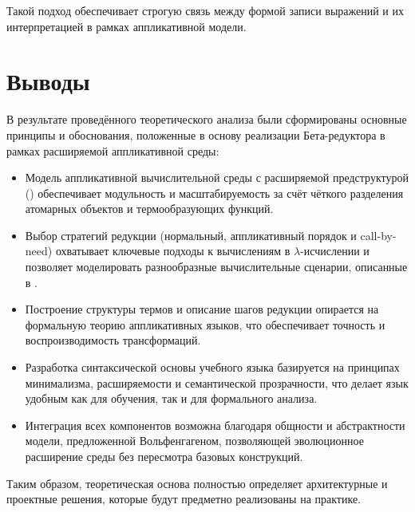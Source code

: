Такой подход обеспечивает строгую связь между формой записи выражений и их интерпретацией в рамках аппликативной модели.

\section{Выводы}

В результате проведённого теоретического анализа были сформированы основные принципы и обоснования, положенные в основу реализации Бета-редуктора в рамках расширяемой аппликативной среды:

\begin{itemize}
  \item Модель аппликативной вычислительной среды с расширяемой предструктурой (\cite{Roslovtsev2011}) обеспечивает модульность и масштабируемость за счёт чёткого разделения атомарных объектов и термообразующих функций.
  \item Выбор стратегий редукции (нормальный, аппликативный порядок и call-by-need) охватывает ключевые подходы к вычислениям в $\lambda$-исчислении и позволяет моделировать разнообразные вычислительные сценарии, описанные в \cite{Wolfengagen2004}.
  \item Построение структуры термов и описание шагов редукции опирается на формальную теорию аппликативных языков, что обеспечивает точность и воспроизводимость трансформаций.
  \item Разработка синтаксической основы учебного языка базируется на принципах минимализма, расширяемости и семантической прозрачности, что делает язык удобным как для обучения, так и для формального анализа.
  \item Интеграция всех компонентов возможна благодаря общности и абстрактности модели, предложенной Вольфенгагеном, позволяющей эволюционное расширение среды без пересмотра базовых конструкций.
\end{itemize}

Таким образом, теоретическая основа полностью определяет архитектурные и проектные решения, которые будут предметно реализованы на практике.
